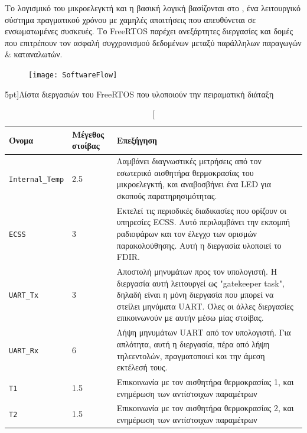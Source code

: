 \documentclass[a4paper,nobib]{tufte-book}
\begin{document}
	Το λογισμικό του μικροελεγκτή και η βασική λογική βασίζονται στο \textbf{}, ένα λειτουργικό σύστημα πραγματικού χρόνου με χαμηλές απαιτήσεις που απευθύνεται σε ενσωματωμένες συσκευές. Το FreeRTOS παρέχει ανεξάρτητες διεργασίες και δομές που επιτρέπουν τον ασφαλή συγχρονισμού δεδομένων μεταξύ παράλληλων παραγωγών \& καταναλωτών.
\begin{figure}[h]
	\texttt{[image: SoftwareFlow]}
	\caption{}
	\label{sec:softwareflow}
\end{figure}

\begin{table}[h]
	\centering
	\caption[][5pt]{Λίστα διεργασιών του Free\acs{RTOS} που υλοποιούν την πειραματική διάταξη}
	\label{tab:rtos-tasks}
	\renewcommand{\arraystretch}{1.5}
	\begin{tabularx}{\textwidth}{@{}llX@{}}
		\toprule
		Όνομα & Μέγεθος στοίβας & Επεξήγηση \\ \midrule
		\texttt{Internal\_Temp} & \SI{2.5}{\kilo\byte} & Λαμβάνει διαγνωστικές μετρήσεις από τον εσωτερικό αισθητήρα θερμοκρασίας του μικροελεγκτή, και αναβοσβήνει ένα LED για σκοπούς παρατηρησιμότητας. \\
		\texttt{ECSS} & \SI{3}{\kilo\byte} & Εκτελεί τις περιοδικές διαδικασίες που ορίζουν οι υπηρεσίες \acs{ECSS}. Αυτό περιλαμβάνει την εκπομπή ραδιοφάρων και τον έλεγχο των ορισμών παρακολούθησης. Αυτή η διεργασία υλοποιεί το \acs{FDIR}. \\
		\texttt{\acs{UART}\_Tx} & \SI{3}{\kilo\byte} & Αποστολή μηνυμάτων προς τον υπολογιστή. Η διεργασία αυτή λειτουργεί ως "gatekeeper task", δηλαδή είναι η μόνη διεργασία που μπορεί να στείλει μηνύματα \acs{UART}. Όλες οι άλλες διεργασίες επικοινωνούν με αυτήν μέσω μίας στοίβας. \\
		\texttt{\acs{UART}\_Rx} & \SI{6}{\kilo\byte} & Λήψη μηνυμάτων \acs{UART} από τον υπολογιστή. Για απλότητα, αυτή η διεργασία, πέρα από λήψη τηλεεντολών, πραγματοποιεί και την άμεση εκτέλεσή τους. \\
		\texttt{T1} & \SI{1.5}{\kilo\byte} & Επικοινωνία με τον αισθητήρα θερμοκρασίας 1, και ενημέρωση των αντίστοιχων παραμέτρων \\
		\texttt{T2} & \SI{1.5}{\kilo\byte} & Επικοινωνία με τον αισθητήρα θερμοκρασίας 2, και ενημέρωση των αντίστοιχων παραμέτρων \\ \bottomrule
	\end{tabularx}
\end{table}
\end{document}
